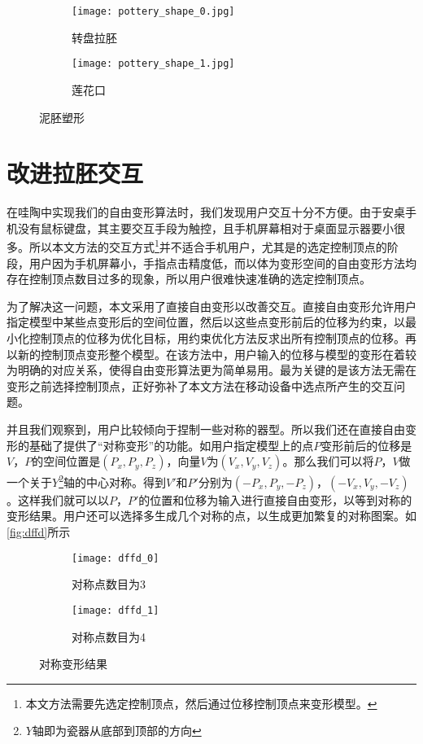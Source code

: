 \begin{figure}[htbp]
	\centering
	\begin{subfigure}[b]{.4\textwidth}
		\centering
		\texttt{[image: pottery\_shape\_0.jpg]}
		\caption{转盘拉胚}\label{subfig:pottery_shape_0}
	\end{subfigure}
	\begin{subfigure}[b]{.4\textwidth}
		\centering
		\texttt{[image: pottery\_shape\_1.jpg]}
		\caption{莲花口}\label{subfig:pottery_shape_1}
	\end{subfigure}
	\caption{泥胚塑形}\label{fig:pottery_shape}
\end{figure}

\section{改进拉胚交互}
在哇陶中实现我们的自由变形算法时，我们发现用户交互十分不方便。由于安桌手机没有鼠标键盘，其主要交互手段为触控，且手机屏幕相对于桌面显示器要小很多。所以本文方法的交互方式\footnote{本文方法需要先选定控制顶点，然后通过位移控制顶点来变形模型。}并不适合手机用户，尤其是的选定控制顶点的阶段，用户因为手机屏幕小，手指点击精度低，而以体为变形空间的自由变形方法均存在控制顶点数目过多的现象，所以用户很难快速准确的选定控制顶点。

为了解决这一问题，本文采用了直接自由变形\cite{hsu1992}以改善交互。直接自由变形允许用户指定模型中某些点变形后的空间位置，然后以这些点变形前后的位移为约束，以最小化控制顶点的位移为优化目标，用约束优化方法反求出所有控制顶点的位移。再以新的控制顶点变形整个模型。在该方法中，用户输入的位移与模型的变形在着较为明确的对应关系，使得自由变形算法更为简单易用。最为关键的是该方法无需在变形之前选择控制顶点，正好弥补了本文方法在移动设备中选点所产生的交互问题。

并且我们观察到，用户比较倾向于捏制一些对称的器型。所以我们还在直接自由变形的基础了提供了“对称变形”的功能。如用户指定模型上的点$P$变形前后的位移是$V$，$P$的空间位置是$(P_x, P_y, P_z)$，向量$V$为$(V_x, V_y, V_z)$。那么我们可以将$P$，$V$做一个关于$Y$\footnote{$Y$轴即为瓷器从底部到顶部的方向}轴的中心对称。得到$V'$和$P'$分别为$(-P_x, P_y, -P_z)$，$(-V_x, V_y, -V_z)$。这样我们就可以以$P$，$P'$的位置和位移为输入进行直接自由变形，以等到对称的变形结果。用户还可以选择多生成几个对称的点，以生成更加繁复的对称图案。如\autoref{fig:dffd}所示

\begin{figure}[htbp]
	\centering
	\begin{subfigure}[b]{.4\textwidth}
		\centering
		\texttt{[image: dffd\_0]}
		\caption{对称点数目为3}\label{subfig:dffd_0}
	\end{subfigure}
	\begin{subfigure}[b]{.4\textwidth}
		\centering
		\texttt{[image: dffd\_1]}
		\caption{对称点数目为4}\label{subfig:dffd_1}
	\end{subfigure}
	\caption{对称变形结果}\label{fig:dffd}
\end{figure}
